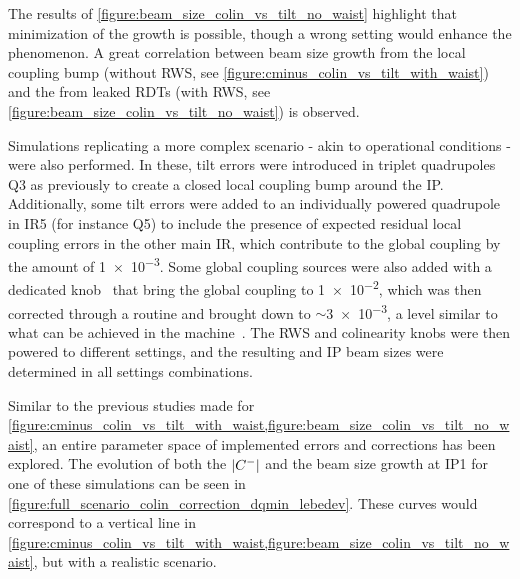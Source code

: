 The results of \cref{figure:beam_size_colin_vs_tilt_no_waist} highlight that minimization of the growth is possible, though a wrong setting would enhance the phenomenon.
A great correlation between beam size growth from the local coupling bump (without RWS, see \cref{figure:cminus_colin_vs_tilt_with_waist}) and the  from leaked RDTs (with RWS, see \cref{figure:beam_size_colin_vs_tilt_no_waist}) is observed.

Simulations replicating a more complex scenario - akin to operational conditions - were also performed.
In these, tilt errors were introduced in triplet quadrupoles Q\num{3} as previously to create a closed local coupling bump around the IP.
Additionally, some tilt errors were added to an individually powered quadrupole in IR\num{5} (for instance Q\num{5}) to include the presence of expected residual local coupling errors in the other main IR, which contribute to the global coupling by the amount of \num{1e-3}.
Some global coupling sources were also added with a dedicated knob~\cite{CERN:Tomas:Optimizing_Global_Coupling_Knobs_LHC} that bring the global coupling to \num{1e-2}, which was then corrected through a routine and brought down to \(\sim\)\num{3e-3}, a level similar to what can be achieved in the machine~\cite{PRES:Persson:Transverse_Coupling_OMC_OP,PRES:Persson:Transverse_Coupling_Stability_HLLHC_WP2}.
The RWS and colinearity knobs were then powered to different settings, and the resulting  and IP beam sizes were determined in all settings combinations.

Similar to the previous studies made for \cref{figure:cminus_colin_vs_tilt_with_waist,figure:beam_size_colin_vs_tilt_no_waist}, an entire parameter space of implemented errors and corrections has been explored.
The evolution of both the \(\left\lvert C^{-} \right\rvert\) and the beam size growth at IP\num{1} for one of these simulations can be seen in \cref{figure:full_scenario_colin_correction_dqmin_lebedev}.
These curves would correspond to a vertical line in \cref{figure:cminus_colin_vs_tilt_with_waist,figure:beam_size_colin_vs_tilt_no_waist}, but with a realistic scenario.

